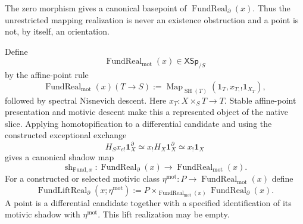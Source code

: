The zero morphism gives a canonical basepoint of
$\operatorname{FundReal}_{\partial}(x)$.  Thus the unrestricted mapping
realization is never an existence obstruction and a point is not, by itself, an
orientation.

\begin{construction}
\label{constr:prequantum-fundamental-class-shadow-lift}
Define
\[
\operatorname{FundReal}_{\mathrm{mot}}(x)\in\mathsf{XSp}_{/S}
\]
by the affine-point rule
\[
\operatorname{FundReal}_{\mathrm{mot}}(x)(T\to S)
:=
\operatorname{Map}_{\operatorname{SH}(T)}
\left(\mathbf1_T,x_{T,!}\mathbf1_{X_T}\right),
\]
followed by spectral Nisnevich descent.  Here
$x_T:X\times_ST\to T$.  Stable affine-point presentation and motivic descent
make this a represented object of the native slice.
Applying homotopification to a differential candidate and using the constructed
exceptional exchange
\[
H_Sx_{e!}\mathbf1_X^\partial\simeq x_!H_X\mathbf1_X^\partial
\simeq x_!\mathbf1_X
\]
gives a canonical shadow map
\[
\operatorname{sh}_{\mathrm{Fund},x}:
\operatorname{FundReal}_{\partial}(x)
\longrightarrow
\operatorname{FundReal}_{\mathrm{mot}}(x).
\]
For a constructed or selected motivic class
$\eta^{\mathrm{mot}}:P\to\operatorname{FundReal}_{\mathrm{mot}}(x)$ define
\[
\boxed{
\operatorname{FundLiftReal}_{\partial}(x;\eta^{\mathrm{mot}})
:=
P\times_{\operatorname{FundReal}_{\mathrm{mot}}(x)}
\operatorname{FundReal}_{\partial}(x).
}
\]
A point is a differential candidate together with a specified identification of
its motivic shadow with $\eta^{\mathrm{mot}}$.  This lift realization may be
empty.
\end{construction}


